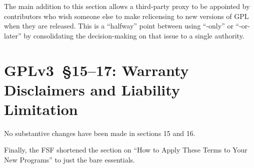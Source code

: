 The main addition to this section allows a third-party proxy to be appointed
by contributors who wish someone else to make relicensing to new versions of
GPL when they are released.  This is a ``halfway'' point between using ``-only''
or ``-or-later'' by consolidating the decision-making on that issue to a
single authority.


\section{GPLv3~\S15--17: Warranty Disclaimers and Liability Limitation}

No substantive changes have been made in sections 15 and 16.









Finally, the FSF shortened the section on ``How to Apply These
Terms to Your New Programs'' to just the bare essentials.

